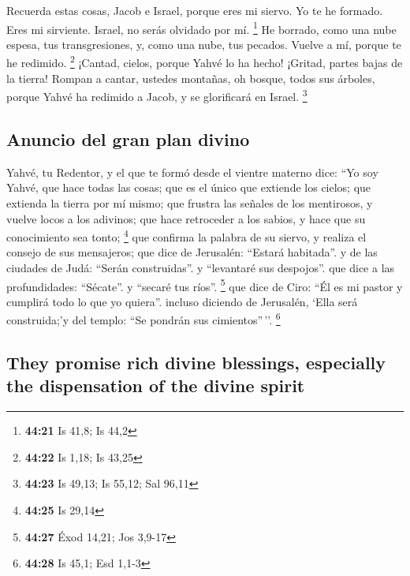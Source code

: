 \begin{paracol}{2}
 Recuerda estas cosas, Jacob e Israel, porque eres mi
siervo. Yo te he formado. Eres mi sirviente. Israel, no serás olvidado
por mí. \footnote{\textbf{44:21} Is 41,8; Is 44,2}  He
borrado, como una nube espesa, tus transgresiones, y, como una nube, tus
pecados. Vuelve a mí, porque te he redimido. \footnote{\textbf{44:22} Is
  1,18; Is 43,25}  ¡Cantad, cielos, porque Yahvé lo ha
hecho! ¡Gritad, partes bajas de la tierra! Rompan a cantar, ustedes
montañas, oh bosque, todos sus árboles, porque Yahvé ha redimido a
Jacob, y se glorificará en Israel. \footnote{\textbf{44:23} Is 49,13; Is
  55,12; Sal 96,11}

\hypertarget{anuncio-del-gran-plan-divino}{%
\subsection{Anuncio del gran plan
divino}\label{anuncio-del-gran-plan-divino}}

 Yahvé, tu Redentor, y el que te formó desde el vientre
materno dice: ``Yo soy Yahvé, que hace todas las cosas; que es el único
que extiende los cielos; que extienda la tierra por mí mismo;
 que frustra las señales de los mentirosos, y vuelve
locos a los adivinos; que hace retroceder a los sabios, y hace que su
conocimiento sea tonto; \footnote{\textbf{44:25} Is 29,14}
 que confirma la palabra de su siervo, y realiza el
consejo de sus mensajeros; que dice de Jerusalén: ``Estará habitada''. y
de las ciudades de Judá: ``Serán construidas''. y ``levantaré sus
despojos''.  que dice a las profundidades: ``Sécate''. y
``secaré tus ríos''. \footnote{\textbf{44:27} Éxod 14,21; Jos 3,9-17}
 que dice de Ciro: ``Él es mi pastor y cumplirá todo lo
que yo quiera''. incluso diciendo de Jerusalén, `Ella será construida;'y
del templo: ``Se pondrán sus cimientos''\,''. \footnote{\textbf{44:28}
  Is 45,1; Esd 1,1-3}

\switchcolumn
\begin{otherlanguage}{english}

\hypertarget{they-promise-rich-divine-blessings-especially-the-dispensation-of-the-divine-spirit}{%
\subsection{They promise rich divine blessings, especially the
dispensation of the divine
spirit}\label{they-promise-rich-divine-blessings-especially-the-dispensation-of-the-divine-spirit}}


\end{otherlanguage}
\end{paracol}

